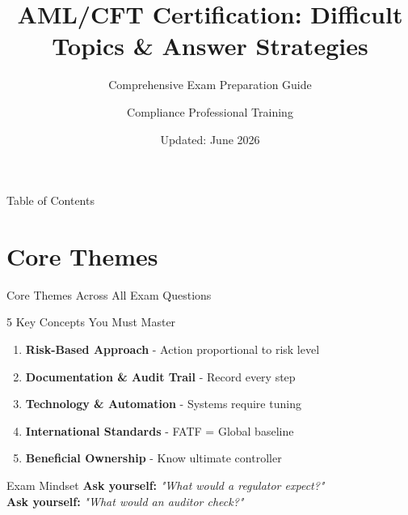 \documentclass{beamer}
\title{AML/CFT Certification: Difficult Topics \& Answer Strategies}
\subtitle{Comprehensive Exam Preparation Guide}
\author{Compliance Professional Training}
\date{Updated: June 2026}
\begin{document}
\begin{frame}
\titlepage
\end{frame}

\begin{frame}{Table of Contents}
\tableofcontents
\end{frame}

\section{Core Themes}
\begin{frame}{Core Themes Across All Exam Questions}
\begin{block}{5 Key Concepts You Must Master}
\begin{enumerate}
    \item \textbf{Risk-Based Approach} - Action proportional to risk level
    \item \textbf{Documentation \& Audit Trail} - Record every step
    \item \textbf{Technology \& Automation} - Systems require tuning
    \item \textbf{International Standards} - FATF = Global baseline
    \item \textbf{Beneficial Ownership} - Know ultimate controller
\end{enumerate}
\end{block}
\begin{alertblock}{Exam Mindset}
\textbf{Ask yourself:} \textit{"What would a regulator expect?"} \\
\textbf{Ask yourself:} \textit{"What would an auditor check?"}
\end{alertblock}
\end{frame}

\end{document}
